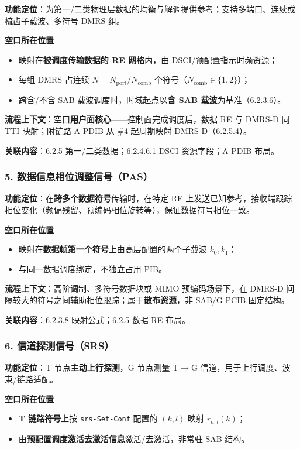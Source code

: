 \documentclass[11pt,a4paper]{ctexart}
\begin{document}
\textbf{功能定位}：为第一/二类物理层数据的均衡与解调提供参考；支持多端口、连续或梳齿子载波、多符号 DMRS 组。

\textbf{空口所在位置}
\begin{itemize}[nosep]
  \item 映射在\textbf{被调度传输数据的 RE 网格}内，由 DSCI/预配置指示时频资源；
  \item 每组 DMRS 占连续 $N = N_{\mathrm{port}}/N_{\mathrm{comb}}$ 个符号（$N_{\mathrm{comb}}{\in}\{1,2\}$）；
  \item 跨含/不含 SAB 载波调度时，时域起点以\textbf{含 SAB 载波}为基准（6.2.3.6）。
\end{itemize}

\textbf{流程上下文}：空口\textbf{用户面核心}——控制面完成调度后，数据 RE 与 DMRS-D 同 TTI 映射；附链路 A-PDIB 从 \#4 起周期映射 DMRS-D（6.2.5.4）。

\textbf{关联内容}：6.2.5 第一/二类数据；6.2.4.6.1 DSCI 资源字段；A-PDIB 布局。

\subsubsection{5. 数据信息相位调整信号（PAS）}

\textbf{功能定位}：在\textbf{跨多个数据符号}传输时，在特定 RE 上发送已知参考，接收端跟踪相位变化（频偏残留、预编码相位旋转等），保证数据符号相位一致。

\textbf{空口所在位置}
\begin{itemize}[nosep]
  \item 映射在\textbf{数据帧第一个符号}上由高层配置的两个子载波 $k_0, k_1$；
  \item 与同一数据调度绑定，不独立占用 PIB。
\end{itemize}

\textbf{流程上下文}：高阶调制、多符号数据块或 MIMO 预编码场景下，在 DMRS-D 间隔较大的符号之间辅助相位跟踪；属于\textbf{散布资源}，非 SAB/G-PCIB 固定结构。

\textbf{关联内容}：6.2.3.8 映射公式；6.2.5 数据 RE 布局。

\subsubsection{6. 信道探测信号（SRS）}

\textbf{功能定位}：T 节点\textbf{主动上行探测}，G 节点测量 T$\rightarrow$G 信道，用于上行调度、波束/链路适配。

\textbf{空口所在位置}
\begin{itemize}[nosep]
  \item \textbf{T 链路符号}上按 \texttt{srs-Set-Conf} 配置的 $(k,l)$ 映射 $r_{n,l}(k)$；
  \item 由\textbf{预配置调度激活去激活信息}激活/去激活，非常驻 SAB 结构。
\end{itemize}
\end{document}
